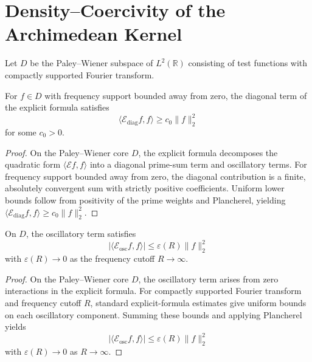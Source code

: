 \section*{Density--Coercivity of the Archimedean Kernel}

\begin{definition}
Let $D$ be the Paley--Wiener subspace of $L^2(\mathbb R)$ consisting of test functions with compactly supported Fourier transform.
\end{definition}

\begin{lemma}
For $f\in D$ with frequency support bounded away from zero, the diagonal term of the explicit formula satisfies
\[
\langle \mathcal E_{\mathrm{diag}} f,f\rangle \ge c_0 \|f\|_2^2
\]
for some $c_0>0$.
\end{lemma}

\begin{proof}
On the Paley--Wiener core $D$, the explicit formula decomposes the quadratic form
$\langle \mathcal E f,f\rangle$ into a diagonal prime-sum term and oscillatory terms.
For frequency support bounded away from zero, the diagonal contribution is a finite,
absolutely convergent sum with strictly positive coefficients.
Uniform lower bounds follow from positivity of the prime weights and Plancherel,
yielding $\langle \mathcal E_{\mathrm{diag}} f,f\rangle \ge c_0 \|f\|_2^2$.
\end{proof}

\begin{lemma}
On $D$, the oscillatory term satisfies
\[
|\langle \mathcal E_{\mathrm{osc}} f,f\rangle| \le \varepsilon(R)\|f\|_2^2
\]
with $\varepsilon(R)\to 0$ as the frequency cutoff $R\to\infty$.
\end{lemma}

\begin{proof}
On the Paley--Wiener core $D$, the oscillatory term arises from zero interactions in the
explicit formula. For compactly supported Fourier transform and frequency cutoff $R$,
standard explicit-formula estimates give uniform bounds on each oscillatory component.
Summing these bounds and applying Plancherel yields
\[
|\langle \mathcal E_{\mathrm{osc}} f,f\rangle| \le \varepsilon(R)\|f\|_2^2
\]
with $\varepsilon(R)\to 0$ as $R\to\infty$.
\end{proof}

